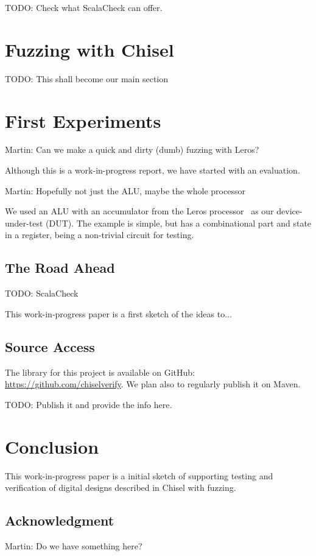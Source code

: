 \documentclass[conference]{IEEEtran}
\newcommand{\todo}[1]{{\color{olive} TODO: #1}}
\newcommand{\martin}[1]{{\color{blue} Martin: #1}}
\begin{document}
\todo{Check what ScalaCheck can offer.}


\section{Fuzzing with Chisel}

\todo{This shall become our main section}

\section{First Experiments}
\label{sec:eval}

\martin{Can we make a quick and dirty (dumb) fuzzing with Leros?}

Although this is a work-in-progress report, we have started with an evaluation.

\martin{Hopefully not just the ALU, maybe the whole processor}

We used an ALU with an accumulator from the Leros processor~\cite{leros:arcs2019}
as our device-under-test (DUT).
The example is simple, but has a combinational part and state in a register, being
a non-trivial circuit for testing.







\subsection{The Road Ahead}

\todo{ScalaCheck}

This work-in-progress paper is a first sketch of the ideas to...


\subsection{Source Access}

The library for this project is available on GitHub:\\ \url{https://github.com/chiselverify}.
We plan also to regularly publish it on Maven.

\todo{Publish it and provide the info here.}


\section{Conclusion}
\label{sec:conclusion}

This work-in-progress paper is a  initial sketch of supporting testing and verification
of digital designs described in Chisel with fuzzing.




\subsection*{Acknowledgment}

\martin{Do we have something here?}




\end{document}
